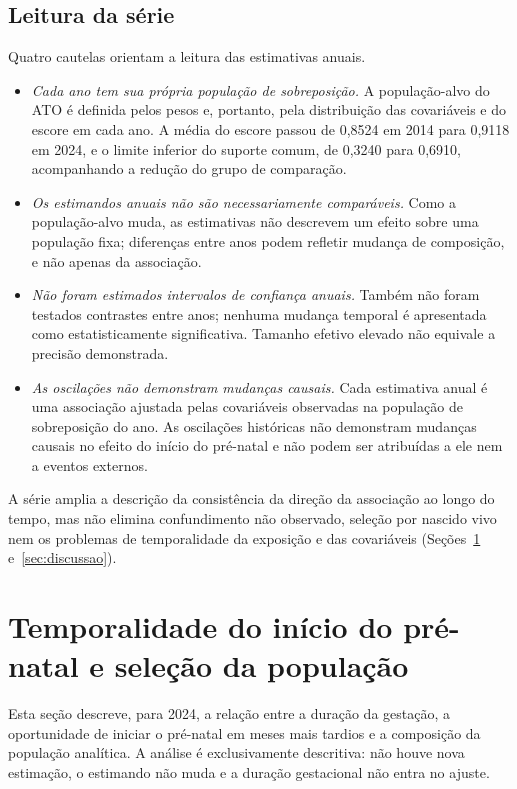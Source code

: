 \documentclass[11pt,a4paper]{article}
\begin{document}
\subsection{Leitura da série}

Quatro cautelas orientam a leitura das estimativas anuais.
\begin{itemize}
\item \emph{Cada ano tem sua própria população de sobreposição.} A população-alvo do ATO
é definida pelos pesos e, portanto, pela distribuição das covariáveis e do escore em cada
ano. A média do escore passou de 0,8524 em 2014 para 0,9118 em 2024, e o limite inferior
do suporte comum, de 0,3240 para 0,6910, acompanhando a redução do grupo de comparação.
\item \emph{Os estimandos anuais não são necessariamente comparáveis.} Como a
população-alvo muda, as estimativas não descrevem um efeito sobre uma população fixa;
diferenças entre anos podem refletir mudança de composição, e não apenas da associação.
\item \emph{Não foram estimados intervalos de confiança anuais.} Também não foram testados
contrastes entre anos; nenhuma mudança temporal é apresentada como estatisticamente
significativa. Tamanho efetivo elevado não equivale a precisão demonstrada.
\item \emph{As oscilações não demonstram mudanças causais.} Cada estimativa anual é uma
associação ajustada pelas covariáveis observadas na população de sobreposição do ano. As
oscilações históricas não demonstram mudanças causais no efeito do início do pré-natal e
não podem ser atribuídas a ele nem a eventos externos.
\end{itemize}
A série amplia a descrição da consistência da direção da associação ao longo do tempo,
mas não elimina confundimento não observado, seleção por nascido vivo nem os problemas de
temporalidade da exposição e das covariáveis (Seções~\ref{sec:selecao}
e~\ref{sec:discussao}).

\section{Temporalidade do início do pré-natal e seleção da população}\label{sec:selecao}

Esta seção descreve, para 2024, a relação entre a duração da gestação, a oportunidade de
iniciar o pré-natal em meses mais tardios e a composição da população analítica. A análise
é exclusivamente descritiva: não houve nova estimação, o estimando não muda e a duração
gestacional não entra no ajuste.
\end{document}
